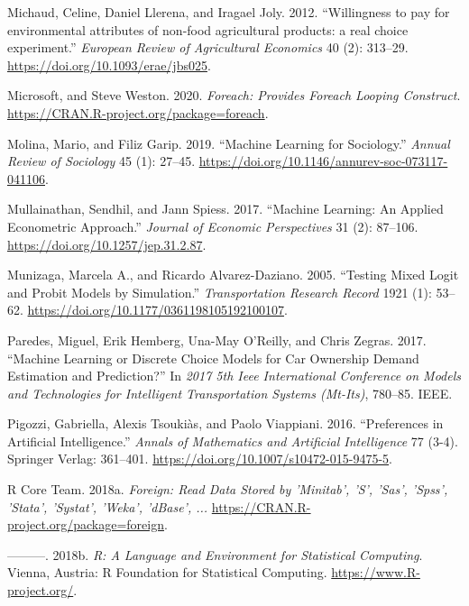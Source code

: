 \documentclass[12pt,]{article}
\begin{document}
\leavevmode\hypertarget{ref-llerena2013rose}{}%
Michaud, Celine, Daniel Llerena, and Iragael Joly. 2012. ``Willingness
to pay for environmental attributes of non-food agricultural products: a
real choice experiment.'' \emph{European Review of Agricultural
Economics} 40 (2): 313--29. \url{https://doi.org/10.1093/erae/jbs025}.

\leavevmode\hypertarget{ref-R-foreach}{}%
Microsoft, and Steve Weston. 2020. \emph{Foreach: Provides Foreach
Looping Construct}. \url{https://CRAN.R-project.org/package=foreach}.

\leavevmode\hypertarget{ref-molina2019soc}{}%
Molina, Mario, and Filiz Garip. 2019. ``Machine Learning for
Sociology.'' \emph{Annual Review of Sociology} 45 (1): 27--45.
\url{https://doi.org/10.1146/annurev-soc-073117-041106}.

\leavevmode\hypertarget{ref-mullainathan2017ml}{}%
Mullainathan, Sendhil, and Jann Spiess. 2017. ``Machine Learning: An
Applied Econometric Approach.'' \emph{Journal of Economic Perspectives}
31 (2): 87--106. \url{https://doi.org/10.1257/jep.31.2.87}.

\leavevmode\hypertarget{ref-munizaga2005mlyp}{}%
Munizaga, Marcela A., and Ricardo Alvarez-Daziano. 2005. ``Testing Mixed
Logit and Probit Models by Simulation.'' \emph{Transportation Research
Record} 1921 (1): 53--62.
\url{https://doi.org/10.1177/0361198105192100107}.

\leavevmode\hypertarget{ref-paredes2017machine}{}%
Paredes, Miguel, Erik Hemberg, Una-May O'Reilly, and Chris Zegras. 2017.
``Machine Learning or Discrete Choice Models for Car Ownership Demand
Estimation and Prediction?'' In \emph{2017 5th Ieee International
Conference on Models and Technologies for Intelligent Transportation
Systems (Mt-Its)}, 780--85. IEEE.

\leavevmode\hypertarget{ref-pigozzi2016pai}{}%
Pigozzi, Gabriella, Alexis Tsoukiàs, and Paolo Viappiani. 2016.
``Preferences in Artificial Intelligence.'' \emph{Annals of Mathematics
and Artificial Intelligence} 77 (3-4). Springer Verlag: 361--401.
\url{https://doi.org/10.1007/s10472-015-9475-5}.

\leavevmode\hypertarget{ref-R-foreign}{}%
R Core Team. 2018a. \emph{Foreign: Read Data Stored by 'Minitab', 'S',
'Sas', 'Spss', 'Stata', 'Systat', 'Weka', 'dBase', ...}
\url{https://CRAN.R-project.org/package=foreign}.

\leavevmode\hypertarget{ref-R-base}{}%
---------. 2018b. \emph{R: A Language and Environment for Statistical
Computing}. Vienna, Austria: R Foundation for Statistical Computing.
\url{https://www.R-project.org/}.
\end{document}
